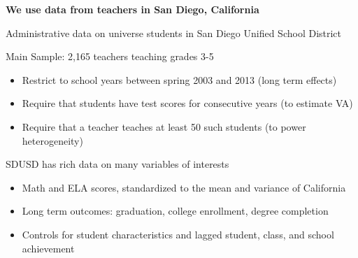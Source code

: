 \documentclass[t,aspectratio=169,11pt,presentation]{beamer}
\newenvironment{wideitemize}{\itemize\addtolength{\itemsep}{14pt}}{\enditemize}
\begin{document}
\begin{frame}{\textbf{We use data from teachers in San Diego, California}}


\begin{wideitemize}
    \item Administrative data on universe students in San Diego Unified School District

    \item<2-> Main Sample: 2,165 teachers teaching grades 3-5
        
    \begin{itemize}
        \item Restrict to school years between spring 2003 and 2013 (long term effects)
        \item Require that students have test scores for consecutive years (to estimate VA)
        \item Require that a teacher teaches at least 50 such students (to power heterogeneity)
    \end{itemize}    
         
        

    \item<3-> SDUSD has rich data on many variables of interests
        \begin{itemize}
        \item Math and ELA scores, standardized to the mean and variance of California
        \item Long term outcomes: graduation, college enrollment, degree completion
        \item Controls for student characteristics and lagged student, class, and school achievement
    \end{itemize}  
\end{wideitemize}
\end{frame}



\end{document}

